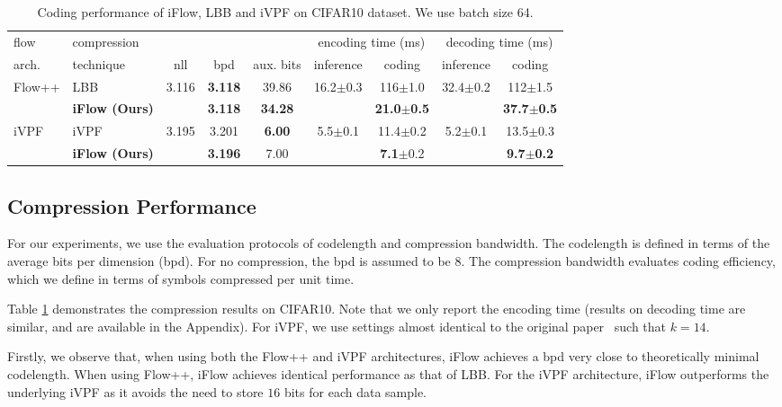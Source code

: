 \documentclass{article}
\newcommand{\ebar}[1]{{\tiny $\pm$#1}}
\begin{document}
\begin{table}[t]
\centering
\small
\caption{Coding performance of iFlow, LBB and iVPF on CIFAR10 dataset. We use batch size 64.}
\label{tab:baselines}
\begin{tabular}{llccccccc}
\toprule
flow & compression & & & & \multicolumn{2}{c}{encoding time (ms)} & \multicolumn{2}{c}{decoding time (ms)}\\
arch. & technique & nll & bpd & aux. bits & inference & coding &  inference & coding \\
\midrule
\multirow{2}{*}{Flow++} & LBB~\cite{ho2019compression} & \multirow{2}{*}{3.116} & \textbf{3.118} & 39.86 & \multirow{2}{*}{16.2\ebar{0.3}} & 116\ebar{1.0} & \multirow{2}{*}{32.4\ebar{0.2}} & 112\ebar{1.5} \\
 & \textbf{iFlow (Ours)} & & \textbf{3.118} & \textbf{34.28} & & \textbf{21.0\ebar{0.5}} & & \textbf{37.7\ebar{0.5}} \\
\midrule
\multirow{2}{*}{iVPF} & iVPF~\cite{zhang2021ivpf} & \multirow{2}{*}{3.195} & 3.201 & \textbf{6.00} & \multirow{2}{*}{5.5\ebar{0.1}} & 11.4\ebar{0.2} & \multirow{2}{*}{5.2\ebar{0.1}} & 13.5\ebar{0.3} \\
 & \textbf{iFlow (Ours)} & & \textbf{3.196} & 7.00 & & \textbf{7.1}\ebar{0.2} & & \bf 9.7\ebar{0.2} \\
\bottomrule
\end{tabular}
\end{table}



\subsection{Compression Performance}

For our experiments, we use the evaluation protocols of codelength and compression bandwidth. The codelength is defined in terms of the average bits per dimension (bpd). For no compression, the bpd is assumed to be 8. 
The compression bandwidth evaluates coding efficiency, which we define in terms of symbols compressed per unit time.

Table \ref{tab:baselines} demonstrates the compression results on CIFAR10. Note that we only report the encoding time (results on decoding time are similar, and are available in the Appendix). For iVPF, we use settings almost identical to the original paper~\cite{zhang2021ivpf} such that $k=14$. 

Firstly, we observe that, when using both the Flow++ and iVPF architectures, iFlow achieves a bpd very close to theoretically minimal codelength. When using Flow++, iFlow achieves identical performance as that of LBB. For the iVPF architecture, iFlow outperforms the underlying iVPF as it avoids the need to store $16$ bits for each data sample. 
\end{document}

